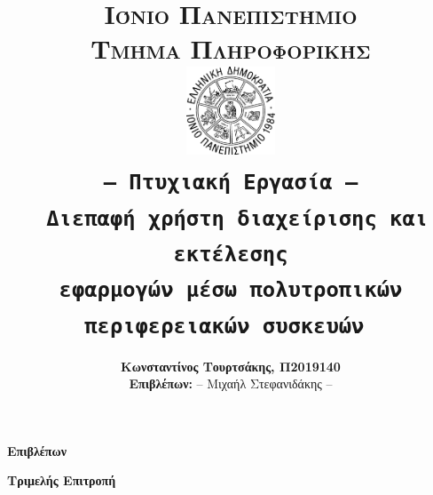 \documentclass[a4paper,11pt,oneside,openany]{ioniothesis}
\begin{document}
\author{\textbf{Κωνσταντίνος Τουρτσάκης, Π2019140} \\ \textbf{Επιβλέπων:}  -- Μιχαήλ Στεφανιδάκης --}
\title{
\textbf{\LARGE{\textsc{Ιόνιο Πανεπιστήμιο}} 
\bigskip \\
\large{\textsc{Τμήμα Πληροφορικής}}
\bigskip \\ \bigskip \bigskip \bigskip
\bigskip \bigskip 
\includegraphics[width=0.2\textwidth]{./pdffigs/ionio_logo.pdf}
\bigskip \\ \bigskip 
\texttt{-- Πτυχιακή Εργασία --}
\bigskip \\ \bigskip
\textbf{\Large{\texttt{
Διεπαφή χρήστη διαχείρισης και εκτέλεσης \\
εφαρμογών μέσω πολυτροπικών \\
περιφερειακών συσκευών
}}}
\bigskip \\ \bigskip}
}
\maketitle





\chapter*{}


\begin{center}
\Large{\textbf{Επιβλέπων}}
\end{center}

\begin{center}
\Large{\textbf{Τριμελής Επιτροπή}}
\end{center}







  
\end{document}
